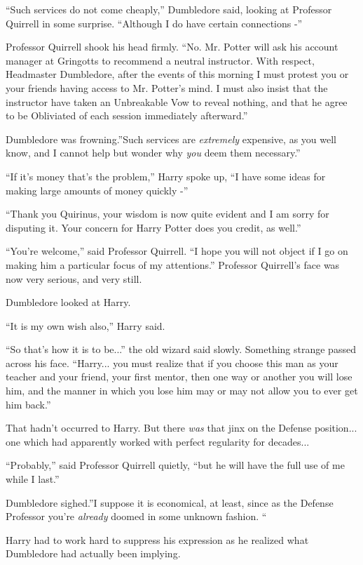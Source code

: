 ``Such services do not come cheaply,'' Dumbledore said, looking at
Professor Quirrell in some surprise. ``Although I do have certain
connections -''

Professor Quirrell shook his head firmly. ``No. Mr. Potter will ask his
account manager at Gringotts to recommend a neutral instructor. With
respect, Headmaster Dumbledore, after the events of this morning I must
protest you or your friends having access to Mr. Potter's mind. I must
also insist that the instructor have taken an Unbreakable Vow to reveal
nothing, and that he agree to be Obliviated of each session immediately
afterward.''

Dumbledore was frowning.''Such services are \emph{extremely} expensive,
as you well know, and I cannot help but wonder why \emph{you} deem them
necessary.''

``If it's money that's the problem,'' Harry spoke up, ``I have some
ideas for making large amounts of money quickly -''

``Thank you Quirinus, your wisdom is now quite evident and I am sorry
for disputing it. Your concern for Harry Potter does you credit, as
well.''

``You're welcome,'' said Professor Quirrell. ``I hope you will not
object if I go on making him a particular focus of my attentions.''
Professor Quirrell's face was now very serious, and very still.

Dumbledore looked at Harry.

``It is my own wish also,'' Harry said.

``So that's how it is to be...'' the old wizard said slowly.
Something strange passed across his face. ``Harry... you must
realize that if you choose this man as your teacher and your friend,
your first mentor, then one way or another you will lose him, and the
manner in which you lose him may or may not allow you to ever get him
back.''

That hadn't occurred to Harry. But there \emph{was} that jinx on the
Defense position... one which had apparently worked with perfect
regularity for decades...

``Probably,'' said Professor Quirrell quietly, ``but he will have the
full use of me while I last.''

Dumbledore sighed.''I suppose it is economical, at least, since as the
Defense Professor you're \emph{already} doomed in some unknown fashion.
``

Harry had to work hard to suppress his expression as he realized what
Dumbledore had actually been implying.

